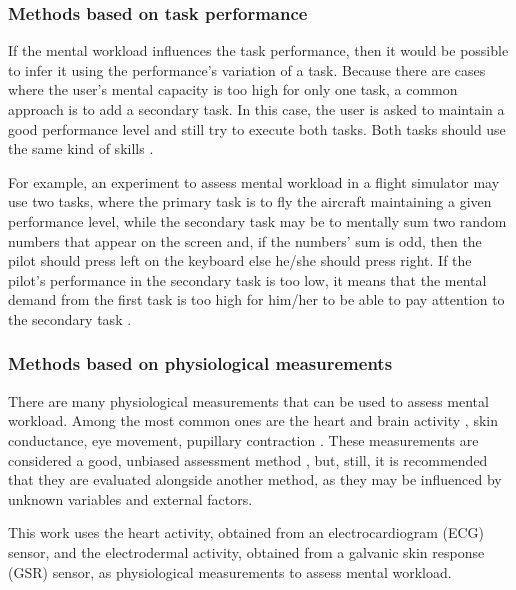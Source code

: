     \subsubsection*{Methods based on task performance}
    
        If the mental workload influences the task performance, then it would be possible to infer it using the performance’s variation of a task. Because there are cases where the user’s mental capacity is too high for only one task, a common approach is to add a secondary task. In this case, the user is asked to maintain a good performance level and still try to execute both tasks. Both tasks should use the same kind of skills \cite{stanton2004handbook, sanders1998human}.
        
        For example, an experiment to assess mental workload in a flight simulator may use two tasks, where the primary task is to fly the aircraft maintaining a given performance level, while the secondary task may be to mentally sum two random numbers that appear on the screen and, if the numbers’ sum is odd, then the pilot should press left on the keyboard else he/she should press right. If the pilot’s performance in the secondary task is too low, it means that the mental demand from the first task is too high for him/her to be able to pay attention to the secondary task \cite{mohanavelu2020cognitive}.
        
    \subsubsection*{Methods based on physiological measurements}
    
        There are many physiological measurements that can be used to assess mental workload. Among the most common ones are the heart and brain activity \cite{chakladar2020eeg, orlandi2018measuring}, skin conductance, eye movement, pupillary contraction \cite{stanton2004handbook, rodriguez2015pupillometry}. These measurements are considered a good, unbiased assessment method \cite{fallahi2016effects}, but, still, it is recommended that they are evaluated alongside another method, as they may be influenced by unknown variables and external factors.

        This work uses the heart activity, obtained from an electrocardiogram (ECG) sensor, and the electrodermal activity, obtained from a galvanic skin response (GSR) sensor, as physiological measurements to assess mental workload.
                
